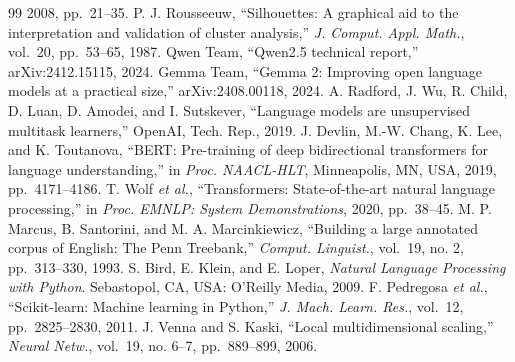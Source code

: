 \documentclass[conference,a4paper]{IEEEtran}
\begin{document}
\begin{thebibliography}{99}
2008, pp.~21--35.
 P. J. Rousseeuw, ``Silhouettes: A graphical aid to the interpretation
and validation of cluster analysis,'' \emph{J. Comput. Appl. Math.},
vol.~20, pp.~53--65, 1987.
 Qwen Team, ``Qwen2.5 technical report,'' arXiv:2412.15115, 2024.
 Gemma Team, ``Gemma 2: Improving open language models at a practical
size,'' arXiv:2408.00118, 2024.
 A. Radford, J. Wu, R. Child, D. Luan, D. Amodei, and I. Sutskever,
``Language models are unsupervised multitask learners,'' OpenAI, Tech.
Rep., 2019.
 J. Devlin, M.-W. Chang, K. Lee, and K. Toutanova, ``BERT: Pre-training
of deep bidirectional transformers for language understanding,'' in
\emph{Proc. NAACL-HLT}, Minneapolis, MN, USA, 2019, pp.~4171--4186.
 T. Wolf \emph{et al.}, ``Transformers: State-of-the-art natural language
processing,'' in \emph{Proc. EMNLP: System Demonstrations}, 2020,
pp.~38--45.
 M. P. Marcus, B. Santorini, and M. A. Marcinkiewicz, ``Building a large
annotated corpus of English: The Penn Treebank,'' \emph{Comput.
Linguist.}, vol.~19, no. 2, pp.~313--330, 1993.
 S. Bird, E. Klein, and E. Loper, \emph{Natural Language Processing with
Python}. Sebastopol, CA, USA: O'Reilly Media, 2009.
 F. Pedregosa \emph{et al.}, ``Scikit-learn: Machine learning in
Python,'' \emph{J. Mach. Learn. Res.}, vol.~12, pp.~2825--2830, 2011.
 J. Venna and S. Kaski, ``Local multidimensional scaling,'' \emph{Neural
Netw.}, vol.~19, no. 6--7, pp.~889--899, 2006.
\end{thebibliography}
\end{document}
